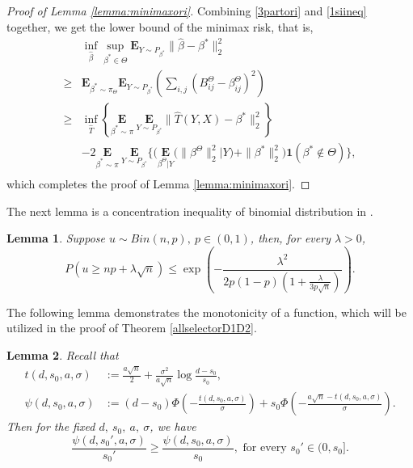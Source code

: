 \documentclass[12pt]{article}
\newtheorem{lemma}{Lemma}
\newtheorem{proof}{Proof}
\begin{document}
\begin{appendix}
\begin{proof}[Proof of Lemma \ref{lemma:minimaxori}]
Combining \eqref{3partori} and \eqref{1siineq} together, we get the lower bound of the minimax risk, that is,
\begin{equation} 
\begin{aligned}
&\inf_{\hat \beta} \sup_{\beta^* \in  {\Theta}} 
    \mathbf{E}_{Y\sim P_{\beta^*} } \|\hat \beta - \beta^* \|_2^2 \\
\ge& \mathbf E_{\beta^* \sim \pi_{\Theta}} \mathbf E_{Y \sim P_{\beta^* } } 
    \left( \sum_{i,j} \left(B_{ij}^{\Theta} - \beta_{ij}^{\Theta} \right)^2 \right)\\
\ge &\inf_{\hat T } \left\{ \underset{\beta^* \sim \pi}{\mathbf E}~ \underset{Y \sim P_{\beta^*} }{\mathbf E} \|\hat T(Y,X) - \beta^* \|_2^2 \right\} \\
    & -2 \underset{\beta^* \sim \pi}{\mathbf E} ~ \underset{Y \sim P_{\beta^*} }{\mathbf E}
    \Bigg\{ \bigg( \underset{\beta^{\Theta} | Y}{\mathbf{E}} \Big( \|\beta^{{\Theta}} \|_2^2\big| Y \Big) + \| \beta^* \|_2^2  \bigg) 
    \mathbf1(\beta^* \notin {\Theta}) \Bigg\},\\
\end{aligned}
\end{equation}
which completes the proof of Lemma \ref{lemma:minimaxori}.
\end{proof}


The next lemma is a concentration inequality of binomial distribution in \cite{SG09}.
\begin{lemma}\label{berncen}
    Suppose $u \sim Bin(n,p),~ p \in (0,1)$, then, for every $\lambda >0$, 
    \begin{equation*}
       P \left(u \ge np+ \lambda \sqrt{n} \right) \le \exp \left( -\frac{\lambda^2}{2p(1-p)(1+\frac{\lambda}{3p\sqrt n})} \right).
    \end{equation*}
\end{lemma}

The following lemma demonstrates the monotonicity of a function, which will be utilized in the proof of Theorem \ref{allselectorD1D2}.
\begin{lemma}\label{mdPsi}
Recall that 
\begin{align*}
  t(d,s_0,a,\sigma ) &:= \frac{a\sqrt n}{2} + \frac{\sigma^2}{a\sqrt n} \log \frac{d-s_0}{s_0},\\
   \psi(d,s_0,a,\sigma) & :=(d-s_0){\Phi}\left(-\frac{t(d,s_0,a,\sigma )}{\sigma}\right) + s_0 {\Phi}\left(-\frac{a\sqrt n-t(d,s_0,a,\sigma )}{\sigma}\right).
\end{align*}
Then for the fixed $d,~s_0, ~a,~\sigma$, we have
\begin{equation*}
\frac{\psi(d,s_0',a,\sigma)}{s_0'} \ge \frac{\psi(d,s_0,a,\sigma)}{s_0}, \text{ for every }  s_0' \in (0, s_0].
\end{equation*}
\end{lemma}


\end{appendix}
\end{document}
